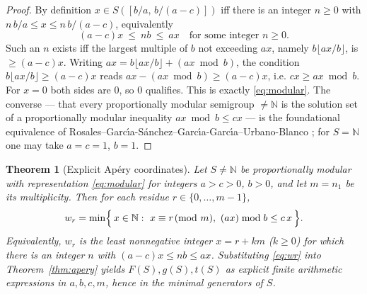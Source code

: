 \documentclass{amsart}
\newtheorem{theorem}{Theorem}
\theoremstyle{definition}
\newcommand{\NN}{\mathbb{N}}
\begin{document}
\begin{proof}
By definition $x\in S([b/a,\,b/(a-c)])$ iff there is an integer $n\ge0$ with
$n\,b/a\le x\le n\,b/(a-c)$, equivalently
\[
(a-c)x\ \le\ nb\ \le\ a x\quad\text{for some integer }n\ge0.
\]
Such an $n$ exists iff the largest multiple of $b$ not exceeding $ax$,
namely $b\lfloor ax/b\rfloor$, is $\ge (a-c)x$. Writing
$ax=b\lfloor ax/b\rfloor+(ax\bmod b)$, the condition
$b\lfloor ax/b\rfloor\ge(a-c)x$ reads $ax-(ax\bmod b)\ge(a-c)x$, i.e.
$cx\ge ax\bmod b$. For $x=0$ both sides are $0$, so $0$ qualifies. This is
exactly \eqref{eq:modular}. The converse --- that every proportionally
modular semigroup $\ne\NN$ is the solution set of a proportionally modular
inequality $ax\bmod b\le cx$ --- is the foundational equivalence of
Rosales--Garc\'\i a-S\'anchez--Garc\'\i a-Garc\'\i a--Urbano-Blanco
\cite{RGGU}; for $S=\NN$ one may take $a=c=1$, $b=1$.
\end{proof}

\begin{theorem}[Explicit Ap\'ery coordinates]\label{thm:bezout}
Let $S\ne\NN$ be proportionally modular with representation
\eqref{eq:modular} for integers $a>c>0$, $b>0$, and let $m=n_1$ be its
multiplicity. Then for each residue $r\in\{0,\dots,m-1\}$,
\begin{equation}\label{eq:wr}
w_r=\min\Bigl\{\,x\in\NN:\ x\equiv r\!\!\pmod m,\
(ax)\bmod b\le c\,x\,\Bigr\}.
\end{equation}
Equivalently, $w_r$ is the least nonnegative integer $x=r+km$ ($k\ge0$) for
which there is an integer $n$ with $(a-c)x\le nb\le ax$. Substituting
\eqref{eq:wr} into Theorem~\ref{thm:apery} yields $F(S),g(S),t(S)$ as
explicit finite arithmetic expressions in $a,b,c,m$, hence in the minimal
generators of $S$.
\end{theorem}
\end{document}
